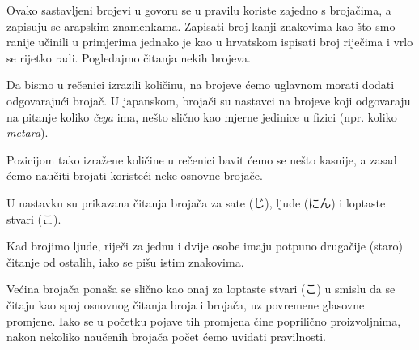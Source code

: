 
	\vspace{5pt}
	Ovako sastavljeni brojevi u govoru se u pravilu koriste zajedno s brojačima, a zapisuju se arapskim znamenkama. Zapisati broj kanji znakovima kao što smo ranije učinili u primjerima jednako je kao u hrvatskom ispisati broj riječima i vrlo se rijetko radi. Pogledajmo čitanja nekih brojeva.
	
	\begin{reibun}
	\end{reibun}

	
	Da bismo u rečenici izrazili količinu, na brojeve ćemo uglavnom morati dodati odgovarajući brojač. U japanskom, brojači su nastavci na brojeve koji odgovaraju na pitanje koliko \textit{čega} ima, nešto slično kao mjerne jedinice u fizici (npr. koliko \textit{metara}).
	
	Pozicijom tako izražene količine u rečenici bavit ćemo se nešto kasnije, a zasad ćemo naučiti brojati koristeći neke osnovne brojače.
	
	\newpage
	
	U nastavku su prikazana čitanja brojača za sate (じ), ljude (にん) i loptaste stvari (こ).
	
	Kad brojimo ljude, riječi za jednu i dvije osobe imaju potpuno drugačije (staro) čitanje od ostalih, iako se pišu istim znakovima.
	
	Većina brojača ponaša se slično kao onaj za loptaste stvari (こ) u smislu da se čitaju kao spoj osnovnog čitanja broja i brojača, uz povremene glasovne promjene. Iako se u početku pojave tih promjena čine poprilično proizvoljnima, nakon nekoliko naučenih brojača počet ćemo uviđati pravilnosti.
	
